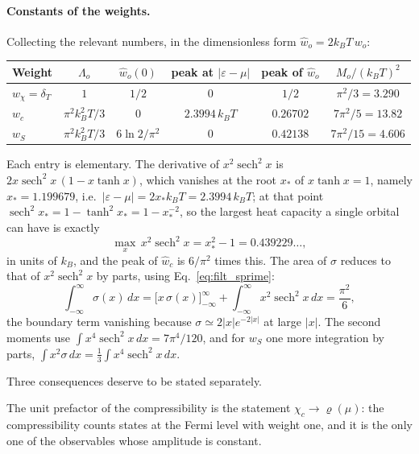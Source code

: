 \documentclass[10pt,a4paper]{article}
\theoremstyle{plain}
\theoremstyle{remark}
\begin{document}
\paragraph{Constants of the weights.} Collecting the relevant numbers, in the
dimensionless form $ \hat w_o = 2k_BT\,w_o $:
\begin{center}
\small
\begin{tabular}{lccccc}
\toprule
Weight & $\Lambda_o$ & $\hat w_o(0)$ & peak at $|\varepsilon-\mu|$
& peak of $\hat w_o$ & $M_o/(k_BT)^{2}$ \\
\midrule
$w_\chi=\delta_T$ & $1$ & $1/2$ & $0$ & $1/2$ & $\pi^{2}/3=3.290$ \\
$w_c$ & $\pi^{2}k_B^{2}T/3$ & $0$ & $2.3994\,k_BT$ & $0.26702$ & $7\pi^{2}/5=13.82$ \\
$w_S$ & $\pi^{2}k_B^{2}T/3$ & $6\ln2/\pi^{2}$ & $0$ & $0.42138$ & $7\pi^{2}/15=4.606$ \\
\bottomrule
\end{tabular}
\end{center}
Each entry is elementary.
The derivative of $ x^{2}\operatorname{sech}^{2}x $ is
$ 2x\operatorname{sech}^2x\,(1-x\tanh x) $, which vanishes at the root $x_\ast$
of $x\tanh x=1$, namely $x_\ast=1.199679$, i.e.\
$|\varepsilon-\mu|=2x_\ast k_BT=2.3994\,k_BT$; at that point
$\operatorname{sech}^2x_\ast=1-\tanh^2x_\ast=1-x_\ast^{-2}$, so the largest
heat capacity a single orbital can have is exactly
\begin{equation}\label{eq:filt_peak}
\max_x\,x^{2}\operatorname{sech}^{2}x=x_\ast^{2}-1=0.439229\ldots,
\end{equation}
in units of $ k_B $, and the peak of $ \hat w_c $ is $ 6/\pi^{2} $ times this.
The area of $ \sigma $ reduces to that of $ x^{2}\operatorname{sech}^{2}x $ by parts,
using Eq.~\eqref{eq:filt_sprime}:
\begin{equation}\label{eq:filt_byparts}
\int_{-\infty}^{\infty}\sigma(x)\,dx
=\Big[x\,\sigma(x)\Big]_{-\infty}^{\infty}
+\int_{-\infty}^{\infty} x^{2}\operatorname{sech}^{2}x\,dx
=\frac{\pi^{2}}{6},
\end{equation}
the boundary term vanishing because $\sigma\simeq 2|x|e^{-2|x|}$ at large $|x|$.
The second moments use $ \int x^{4}\operatorname{sech}^{2}x\,dx = 7\pi^{4}/120 $, and
for $ w_S $ one more integration by parts, $ \int x^{2}\sigma\,dx =
\tfrac13\int x^{4}\operatorname{sech}^{2}x\,dx $.

Three consequences deserve to be stated separately.

The unit prefactor of the compressibility is the statement $ \chi_c \to \varrho(\mu) $:
the compressibility counts states at the Fermi level with weight one, and it is
the only one of the observables whose amplitude is constant.
\end{document}
